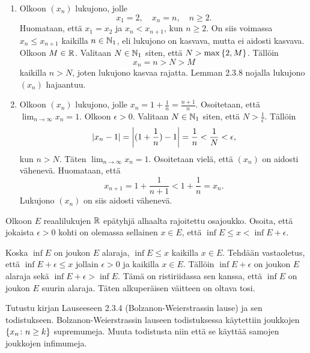 \documentclass[11pt,a4paper]{amsart}
\begin{document}
\begin{solution}
\leavevmode\par
\begin{enumerate}[label=\alph*), nosep]
\item Olkoon \((x_n)\) lukujono, jolle
\[
x_1 = 2, \quad x_n = n, \quad n \geq 2.
\]
Huomataan, että \(x_1 = x_2\) ja \(x_n < x_{n + 1}\), kun \(n \geq 2\).
On siis voimassa \(x_n \leq x_{n + 1}\) kaikilla \(n \in \NNone\), eli
lukujono on kasvava, mutta ei aidosti kasvava. Olkoon \(M \in \RR\).
Valitaan \(N \in \NNone\) siten, että \(N > \maxset{2, M}\). Tällöin
\[
x_n = n > N > M
\]
kaikilla \(n > N\), joten lukujono kasvaa rajatta. Lemman 2.3.8 nojalla
lukujono \((x_n)\) hajaantuu.
\item Olkoon \((x_n)\) lukujono, jolle \(x_n = 1 + \frac{1}{n} =
\frac{n + 1}{n}\). Osoitetaan, että \(\lim_{n \to \infty} x_n = 1\).
Olkoon \(\epsilon > 0\). Valitaan \(N \in \NNone\) siten, että
\(N > \frac{1}{\epsilon}\). Tällöin
\[
\abs{x_n - 1} = \abs*{(1 + \frac{1}{n}) - 1} = \frac{1}{n} <
\frac{1}{N} < \epsilon,
\]
kun \(n > N\). Täten \(\lim_{n \to \infty} x_n = 1\). Osoitetaan vielä, että
\((x_n)\) on aidosti vähenevä. Huomataan, että
\[
x_{n + 1} = 1 + \frac{1}{n + 1} < 1 + \frac{1}{n} = x_n.
\]
Lukujono \((x_n)\) on siis aidosti vähenevä.
\end{enumerate}
\end{solution}

\begin{exercise}
Olkoon \(E\) reaalilukujen \(\RR\) epätyhjä alhaalta rajoitettu osajoukko.
Osoita, että jokaista \(\epsilon > 0\) kohti on olemassa sellainen \(x \in E\),
että \(\inf E \leq x < \inf E + \epsilon\).
\end{exercise}

\begin{solution}
Koska \(\inf E\) on joukon \(E\) alaraja, \(\inf E \leq x\) kaikilla
\(x \in E\).
Tehdään vastaoletus, että \(\inf{E} + \epsilon \leq x\) jollain
\(\epsilon > 0\) ja kaikilla \(x \in E\). Tällöin \(\inf{E} + \epsilon\)
on joukon \(E\) alaraja sekä \(\inf{E} + \epsilon > \inf{E}\).
Tämä on ristiriidassa sen kanssa, että \(\inf{E}\) on joukon \(E\) suurin
alaraja. Täten alkuperäisen väitteen on oltava tosi.
\end{solution}

\begin{exercise}
Tutustu kirjan Lauseeseen 2.3.4 (Bolzanon-Weierstrassin lause) ja sen
todistukseen. Bolzanon-Weierstrassin lauseen todistuksessa käytettiin joukkojen
\(\set{x_n \colon n \geq k}\) supremumeja. Muuta todistusta niin että se käyttää
samojen joukkojen infimumeja.
\end{exercise}
\end{document}
